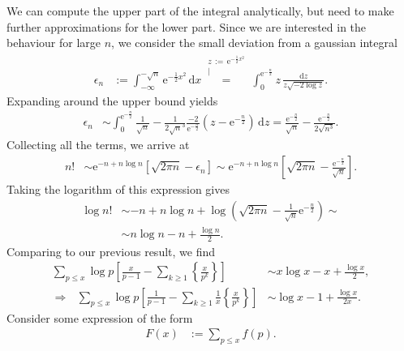 \documentclass[english, parskip=full]{scrartcl}
\newcommand{\kom}{}
\newcommand{\intx}{}
\newcommand{\kla}{}
\newcommand{\klam}{}
\newcommand{\klammer}{}
\newcommand{\e}{\text{e}}
\begin{document}
We can compute the upper part of the integral analytically, but need to make further approximations for the lower part.
Since we are interested in the behaviour for large $n$, we consider the small deviation from a gaussian integral
\begin{align}
\epsilon_n &:= \intx\int_{-\infty}^{-\sqrt{n}} \e^{-\frac{1}{2}x^2} \, \mathrm{d}x \kom\overset{\substack{{z\, :=\, \e^{-\frac{1}{2}x^2}} \\ |}}{=} \intx\int_{0}^{\e^{-\frac{n}{2}}} z \, \frac{\mathrm{d}z}{z \sqrt{-2\log z}}.
\end{align}
Expanding around the upper bound yields
\begin{align}
\epsilon_n &\sim \intx\int_{0}^{\e^{-\frac{n}{2}}} \frac{1}{\sqrt{n}} - \frac{1}{2\sqrt{n}^3} \frac{-2}{\e^{-\frac{n}{2}}} \kla\left( z - \e^{-\frac{n}{2}} \right) \, \mathrm{d}z = \frac{\e^{-\frac{n}{2}}}{\sqrt{n}} - \frac{\e^{-\frac{n}{2}}}{2\sqrt{n^3}} .
\end{align}
Collecting all the terms, we arrive at
\begin{align}
n! &\sim \e^{-n + n\log n} \klam\left[ \sqrt{2\pi n} - \epsilon_n \right] \sim \e^{-n + n\log n} \klam\left[ \sqrt{2\pi n} - \frac{\e^{-\frac{n}{2}}}{\sqrt{n}} \right].
\end{align}
Taking the logarithm of this expression gives
\begin{align}
\log n! &\sim -n + n\log n + \log \kla\left( \sqrt{2\pi n} - \frac{1}{\sqrt{n}} \e^{-\frac{n}{2}} \right) \sim \\
&\sim n\log n - n + \frac{\log n}{2}.
\end{align}
Comparing to our previous result, we find
\begin{align}
\sum_{p\le x} \log p \klam\left[ \frac{x}{p-1} - \sum_{k\ge 1} \klammer\left\{ \frac{x}{p^k} \right\} \right] &\sim x\log x - x + \frac{\log x}{2},\\
\Rightarrow\ \ \ \sum_{p\le x} \log p \klam\left[ \frac{1}{p-1} - \sum_{k\ge 1} \frac{1}{x} \klammer\left\{ \frac{x}{p^k} \right\} \right] &\sim \log x - 1 + \frac{\log x}{2x}.
\end{align}
Consider some expression of the form
\begin{align}
F(x) &:= \sum_{p\le x} f(p).
\end{align}
\end{document}
